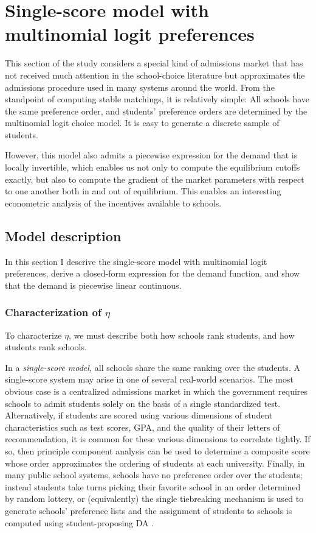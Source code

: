 \documentclass[12pt]{article}
\theoremstyle{definition}
\begin{document}
\section{Single-score model with multinomial logit preferences} \label{singlescoremodel}
This section of the study considers a special kind of admissions market that has not received much attention in the school-choice literature but approximates the admissions procedure used in many systems around the world. From the standpoint of computing stable matchings, it is relatively simple: All schools have the same preference order, and students' preference orders are determined by the multinomial logit choice model. It is easy to generate a discrete sample of students.

However, this model also admits a piecewise expression for the demand that is locally invertible, which enables us not only to compute the equilibrium cutoffs exactly, but also to compute the gradient of the market parameters with respect to one another both in and out of equilibrium. This enables an interesting econometric analysis of the incentives available to schools.

\subsection{Model description} 

In this section I descrive the single-score model with multinomial logit preferences, derive a closed-form expression for the demand function, and show that the demand is piecewise linear continuous. %

\subsubsection{Characterization of $\eta$}

To characterize $\eta$, we must describe both how schools rank students, and how students rank schools.

In a \emph{single-score model,} all schools share the same ranking over the students. A single-score system may arise in one of several real-world scenarios. The most obvious case is a centralized admissions market in which the government requires schools to admit students solely on the basis of a single standardized test. Alternatively, if students are scored using various dimensions of student characteristics such as test scores, GPA, and the quality of their letters of recommendation, it is common for these various dimensions to correlate tightly. If so, then principle component analysis can be used to determine a composite score whose order approximates the ordering of students at each university. Finally, in many public school systems, schools have no preference order over the students; instead students take turns picking their favorite school in an order determined by random lottery, or (equivalently) the single tiebreaking mechanism is used to generate schools’ preference lists and the assignment of students to schools is computed using student-proposing DA \parencite[][]{whatmatters}. 
\end{document}
